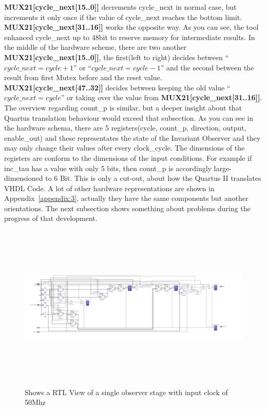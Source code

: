 \textbf{MUX21[cycle\_next[15..0]]} decrements cycle\_next in normal case, but increments it only once if the value of cycle\_next reaches the bottom limit. 
\textbf{MUX21[cycle\_next[31..16]]} works the opposite way. 
As you can see, the tool enhanced cycle\_next up to 48bit to reserve memory for intermediate results.
In the middle of the hardware scheme, there are two another \textbf{MUX21[cycle\_next[15..0]]}, 
the first(left to right) decides between  ``$cycle\_next=cycle+1$'' or ``$cycle\_next=cycle-1$'' and the second 
between the result from first Mutex before and the reset value. \textbf{MUX21[cycle\_next[47..32]]} decides between keeping the old value ``$cycle\_next=cycle$'' or 
taking over the value from \textbf{MUX21[cycle\_next[31..16]]}. The overview regarding count\_p is similar, but a deeper insight about that Quartus translation behaviour would exceed that subsection. 
As you can see in the hardware schema, there are 5 registers(cycle, count\_p, direction, output, enable\_out) 
and these representates the state of the Invariant Observer and they may only change their values after every clock\_cycle. 
The dimensions of the registers are conform to the dimensions of the input conditions. 
For example if inc\_tau has a value with only 5 bits, then count\_p is accordingly large-dimensioned to 6 Bit. 
This is only a cut-out, about how the Quartus II translates VHDL Code. 
A lot of other hardware representations are shown in Appendix~\ref{appendix:3}, actually they have the same components but another orientations. 
The next subsection shows something about problems during the progress of that development. 

\begin{figure}[]
\centering
\includegraphics[width=650px,height=300px,angle=-90]{../../pictures/22.02.2014/onlyObserver/OBS_50M.jpg}
\caption[RTL View of Observer 0 with clock 50Mhz]{Shows a RTL View of a single observer stage with input clock of 50Mhz}
\label{fig:test:only:50:obs0}
\end{figure}

